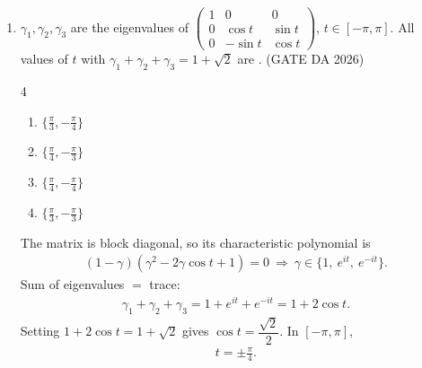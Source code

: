 \begin{enumerate}[label=\textbf{Q.\arabic*},leftmargin=*,start=1]
\item[\textbf{Q.46}] $\gamma_1,\gamma_2,\gamma_3$ are the eigenvalues of
$\begin{pmatrix}1&0&0\\0&\cos t&\sin t\\0&-\sin t&\cos t\end{pmatrix}$, $t\in[-\pi,\pi]$.
All values of $t$ with $\gamma_1+\gamma_2+\gamma_3=1+\sqrt2$ are
\underline{\hspace{1.5cm}}.
\hfill (GATE DA 2026)
\begin{multicols}{4}
\begin{enumerate}[label=(\alph*),itemsep=0pt]
 \item $\{\tfrac\pi3,-\tfrac\pi4\}$ \item $\{\tfrac\pi4,-\tfrac\pi3\}$
 \item $\{\tfrac\pi4,-\tfrac\pi4\}$ \item $\{\tfrac\pi3,-\tfrac\pi3\}$
\end{enumerate}
\end{multicols}
\solution
The matrix is block diagonal, so its characteristic polynomial is
\begin{align}
(1-\gamma)\left(\gamma^2-2\gamma\cos t+1\right)=0
\ \Rightarrow\ \gamma\in\{1,\ e^{it},\ e^{-it}\}.
\end{align}
Sum of eigenvalues $=$ trace:
\begin{align}
\gamma_1+\gamma_2+\gamma_3=1+e^{it}+e^{-it}=1+2\cos t .
\end{align}
Setting $1+2\cos t=1+\sqrt2$ gives $\cos t=\dfrac{\sqrt2}{2}$. In $[-\pi,\pi]$,
\begin{align}
\boxed{t=\pm\frac{\pi}{4}}.
\end{align}


\end{enumerate}
